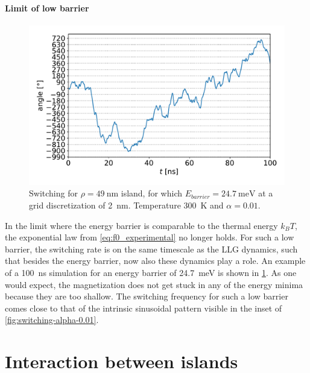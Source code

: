 \documentclass[11pt,a4paper,english]{article}
\begin{document}
\paragraph{Limit of low barrier}
\begin{figure}
    \centering
    \includegraphics[width=0.8\columnwidth]{Figures/biaxial_island/Switching/49x100_300K_alpha0.01_100ns_2nm.pdf}
    \caption{Switching for $\rho=\SI{49}{\nano\metre}$ island, for which $E_{barrier}=\SI{24.7}{\milli\electronvolt}$ at a grid discretization of \SI{2}{\nano\metre}. Temperature \SI{300}{\kelvin} and $\alpha = 0.01$.}
    \label{fig:switching-49x100-300}
\end{figure} %
In the limit where the energy barrier is comparable to the thermal energy $k_B T$, the exponential law from \cref{eq:f0_experimental} no longer holds. For such a low barrier, the switching rate is on the same timescale as the LLG dynamics, such that besides the energy barrier, now also these dynamics play a role. An example of a \SI{100}{\nano\second} simulation for an energy barrier of \SI{24.7}{\milli\electronvolt} is shown in \cref{fig:switching-49x100-300}. As one would expect, the magnetization does not get stuck in any of the energy minima because they are too shallow. The switching frequency for such a low barrier comes close to that of the intrinsic sinusoidal pattern visible in the inset of \cref{fig:switching-alpha-0.01}.


\clearpage
\section{Interaction between islands}
\end{document}
